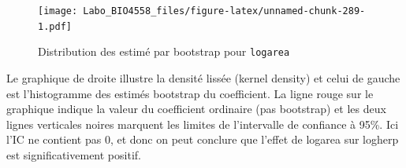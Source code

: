 \documentclass[12pt,]{book}
\newenvironment{Shaded}{\begin{snugshade}}{\end{snugshade}}
\newcommand{\CommentTok}[1]{\textcolor[rgb]{0.56,0.35,0.01}{\textit{#1}}}
\newcommand{\ControlFlowTok}[1]{\textcolor[rgb]{0.13,0.29,0.53}{\textbf{#1}}}
\newcommand{\DataTypeTok}[1]{\textcolor[rgb]{0.13,0.29,0.53}{#1}}
\newcommand{\DecValTok}[1]{\textcolor[rgb]{0.00,0.00,0.81}{#1}}
\newcommand{\FloatTok}[1]{\textcolor[rgb]{0.00,0.00,0.81}{#1}}
\newcommand{\KeywordTok}[1]{\textcolor[rgb]{0.13,0.29,0.53}{\textbf{#1}}}
\newcommand{\NormalTok}[1]{#1}
\newcommand{\OperatorTok}[1]{\textcolor[rgb]{0.81,0.36,0.00}{\textbf{#1}}}
\newcommand{\OtherTok}[1]{\textcolor[rgb]{0.56,0.35,0.01}{#1}}
\newcommand{\StringTok}[1]{\textcolor[rgb]{0.31,0.60,0.02}{#1}}
\begin{document}
\begin{Shaded}
\end{Shaded}

\begin{figure}
\centering
\texttt{[image: Labo\_BIO4558\_files/figure-latex/unnamed-chunk-289-1.pdf]}
\caption{\label{fig:unnamed-chunk-289}Distribution des estimé par bootstrap pour \texttt{logarea}}
\end{figure}

Le graphique de droite illustre la densité lissée (kernel density) et celui de gauche est l'histogramme des estimés bootstrap du coefficient. La ligne rouge sur le graphique indique la valeur du coefficient ordinaire (pas bootstrap) et les deux lignes verticales noires marquent les limites de l'intervalle de confiance à 95\%. Ici l'IC ne contient pas 0, et donc on peut conclure que l'effet de logarea sur logherp est significativement positif.
\end{document}
